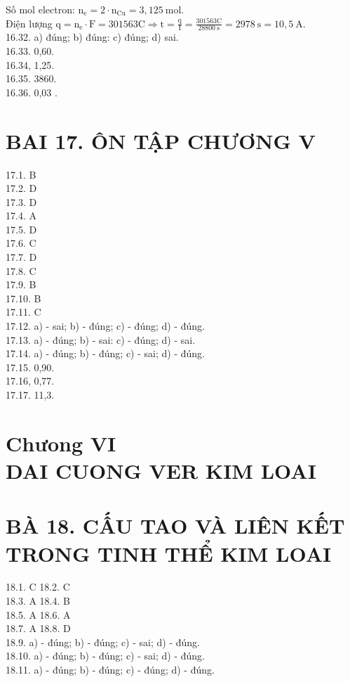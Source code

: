 \documentclass[10pt]{article}
\begin{document}
Số mol electron: $\mathrm{n}_{\mathrm{e}}=2 \cdot \mathrm{n}_{\mathrm{Cu}}=3,125 \mathrm{~mol}$.\\
Điện lượng $\mathrm{q}=\mathrm{n}_{\mathrm{e}} \cdot \mathrm{F}=301563 \mathrm{C} \Rightarrow \mathrm{t}=\frac{\mathrm{q}}{\mathrm{I}}=\frac{301563 \mathrm{C}}{28800 \mathrm{~s}}=2978 \mathrm{~s}=10,5 \mathrm{~A}$.\\
16.32. a) đúng; b) đúng: c) đúng; d) sai.\\
16.33. 0,60.\\
16.34, 1,25.\\
16.35. 3860.\\
16.36. 0,03 .

\section*{BAI 17. ÔN TẬP CHƯƠNG V}
17.1. B\\
17.2. D\\
17.3. D\\
17.4. A\\
17.5. D\\
17.6. C\\
17.7. D\\
17.8. C\\
17.9. B\\
17.10. B\\
17.11. C\\
17.12. a) - sai; b) - đúng; c) - đúng; d) - đúng.\\
17.13. a) - đúng; b) - sai: c) - đúng; d) - sai.\\
17.14. a) - đúng; b) - đúng; c) - sai; d) - đúng.\\
17.15. 0,90.\\
17.16, 0,77.\\
17.17. 11,3.

\section*{Chưong VI \\
 DAI CUONG VER KIM LOAI}
\section*{BÀ 18. CẤU TAO VÀ LIÊN KẾT TRONG TINH THỂ KIM LOAI}
18.1. C 18.2. C\\
18.3. A 18.4. B\\
18.5. A 18.6. A\\
18.7. A 18.8. D\\
18.9. a) - đúng; b) - đúng; c) - sai; d) - đúng.\\
18.10. a) - đúng; b) - đúng; c) - sai; d) - đúng.\\
18.11. a) - đúng; b) - đúng; c) - đúng; d) - đúng.
\end{document}
